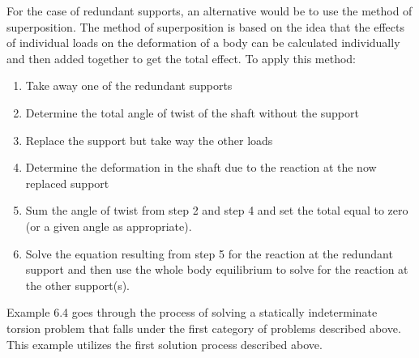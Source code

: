 \documentclass[
  letterpaper,
  DIV=11,
  numbers=noendperiod]{scrreprt}
\providecommand{\tightlist}{%
  \setlength{\itemsep}{0pt}\setlength{\parskip}{0pt}}\usepackage{longtable,booktabs,array}
\begin{document}
For the case of redundant supports, an alternative would be to use the
method of superposition. The method of superposition is based on the
idea that the effects of individual loads on the deformation of a body
can be calculated individually and then added together to get the total
effect. To apply this method:

\begin{enumerate}
\def\labelenumi{\arabic{enumi}.}
\tightlist
\item
  Take away one of the redundant supports
\item
  Determine the total angle of twist of the shaft without the support
\item
  Replace the support but take way the other loads
\item
  Determine the deformation in the shaft due to the reaction at the now
  replaced support
\item
  Sum the angle of twist from step 2 and step 4 and set the total equal
  to zero (or a given angle as appropriate).
\item
  Solve the equation resulting from step 5 for the reaction at the
  redundant support and then use the whole body equilibrium to solve for
  the reaction at the other support(s).
\end{enumerate}

Example 6.4 goes through the process of solving a statically
indeterminate torsion problem that falls under the first category of
problems described above. This example utilizes the first solution
process described above.
\end{document}
